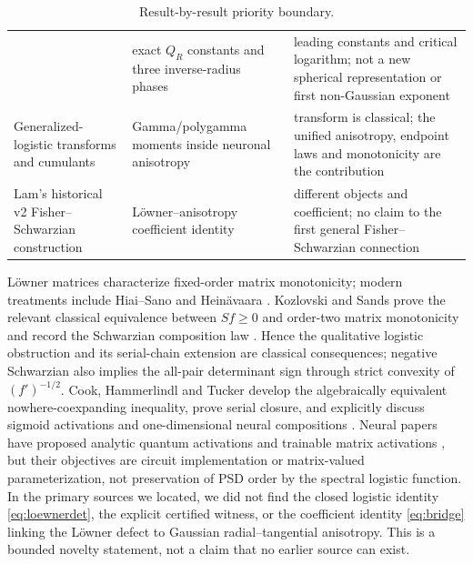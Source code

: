 \documentclass[11pt]{article}
\begin{document}
\begin{table}[H]
\begin{tabular}{>{\raggedright\arraybackslash}p{}
                >{\raggedright\arraybackslash}p{}
                >{\raggedright\arraybackslash}p{}}
 & exact $Q_R$ constants and three inverse-radius phases
 & leading constants and critical logarithm; not a new spherical representation or first
non-Gaussian exponent \\[3pt]
Generalized-logistic transforms and cumulants \cite{ojo2004,lee2025}
& Gamma/polygamma moments inside neuronal anisotropy
& transform is classical; the unified anisotropy, endpoint laws and monotonicity are the contribution \\[3pt]
Lam's historical v2 Fisher--Schwarzian construction \cite{lam2026v2}
& L\"owner--anisotropy coefficient identity
& different objects and coefficient; no claim to the first general Fisher--Schwarzian connection \\
\bottomrule
\end{tabular}
\caption{Result-by-result priority boundary.}
\label{tab:priority}
\end{table}

L\"owner matrices characterize fixed-order matrix monotonicity; modern treatments include Hiai--Sano and
Hein\"avaara \cite{hiai2010,heinavaara2019}.  Kozlovski and Sands prove the relevant classical equivalence between
$Sf\ge0$ and order-two matrix monotonicity and record the Schwarzian composition law
\cite{kozlovski2008}.  Hence the qualitative logistic obstruction and its serial-chain extension are classical
consequences; negative Schwarzian also implies the all-pair determinant sign through strict convexity of
$(f')^{-1/2}$.  Cook, Hammerlindl and Tucker develop the algebraically equivalent nowhere-coexpanding inequality,
prove serial closure, and explicitly discuss sigmoid activations and one-dimensional neural compositions
\cite{cook2023}.  Neural papers have proposed analytic
quantum activations and trainable matrix activations \cite{maronese2022,liu2021}, but their objectives are circuit
implementation or matrix-valued parameterization, not preservation of PSD order by the spectral logistic function.
In the primary sources we located, we did not find the closed logistic identity \eqref{eq:loewnerdet}, the explicit
certified witness, or the coefficient identity \eqref{eq:bridge} linking the L\"owner defect to Gaussian
radial--tangential anisotropy.  This is a bounded novelty statement, not a claim that no earlier source can exist.
\end{document}
